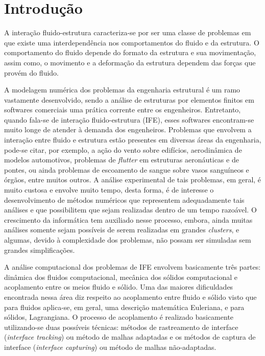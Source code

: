 \documentclass[tese_patricia.tex]{subfiles}
\begin{document}
\chapter[Introdução]{Introdução}\label{capitulo:introducao}

A interação fluido-estrutura caracteriza-se por ser uma classe de problemas em que existe uma interdependência nos comportamentos do fluido e da estrutura. O comportamento do fluido depende do formato da estrutura e sua movimentação, assim como, o movimento e a deformação da estrutura dependem das forças que provém do fluido.

A modelagem numérica dos problemas da engenharia estrutural é um ramo vastamente desenvolvido, sendo a análise de estruturas por elementos finitos em softwares comerciais uma prática corrente entre os engenheiros. Entretanto, quando fala-se de interação fluido-estrutura (IFE), esses softwares encontram-se muito longe de atender à demanda dos engenheiros.
Problemas que envolvem a interação entre fluido e estrutura estão presentes em diversas áreas da engenharia, pode-se citar, por exemplo, a ação do vento sobre edifícios, aerodinâmica de modelos automotivos, problemas de \textit{flutter} em estruturas aeronáuticas e de pontes, ou ainda problemas de escoamento de sangue sobre vasos sanguíneos e órgãos, entre muitos outros. A análise experimental de tais problemas, em geral, é muito custosa e envolve muito tempo, desta forma, é de interesse o desenvolvimento de métodos numéricos que representem adequadamente tais análises e que possibilitem que sejam realizadas dentro de um tempo razoável. O crescimento da informática tem auxiliado nesse processo, embora, ainda muitas análises somente sejam possíveis de serem realizadas em grandes \textit{clusters}, e algumas, devido à complexidade dos problemas, não possam ser simuladas sem grandes simplificações.

A análise computacional dos problemas de IFE envolvem basicamente três partes: dinâmica dos fluidos computacional, mecânica dos sólidos computacional e acoplamento entre os meios fluido e sólido. Uma das maiores dificuldades encontrada nessa área diz respeito ao acoplamento entre fluido e sólido visto que para fluidos aplica-se, em geral, uma descrição matemática Euleriana, e para sólidos, Lagrangiana. O processo de acoplamento é realizado basicamente utilizando-se duas possíveis técnicas: métodos de rastreamento de interface (\textit{interface tracking}) ou método de malhas adaptadas e os métodos  de captura de interface (\textit{interface capturing}) ou método de malhas não-adaptadas. 
\end{document}
